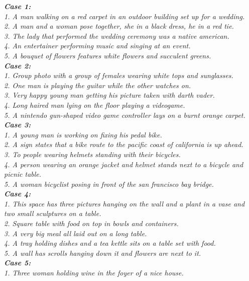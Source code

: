 \documentclass[10pt,twocolumn,letterpaper]{article}
\begin{document}
\textit{\footnotesize{\textbf{Case 1:}\\
1. A man walking on a red carpet in an outdoor building set up for a wedding.\\
2. A man and a woman pose together, she in a black dress, he in a red tie.\\
3. The lady that performed the wedding ceremony was a native american.\\
4. An entertainer performing music and singing at an event.\\
5. A bouquet of flowers features white flowers and succulent greens.\\
\textbf{Case 2:}\\
1. Group photo with a group of females wearing white tops and sunglasses.\\
2. One man is playing the guitar while the other watches on.\\
3. Very happy young man getting his picture taken with darth vader.\\
4. Long haired man lying on the floor playing a videogame.\\
5. A nintendo gun-shaped video game controller lays on a burnt orange carpet.\\
\textbf{Case 3:}\\
1. A young man is working on fixing his pedal bike.\\
2. A sign states that a bike route to the pacific coast of california is up ahead.\\
3. To people wearing helmets standing with their bicycles.\\
4. A person wearing an orange jacket and helmet stands next to a bicycle and picnic table.\\
5. A woman bicyclist posing in front of the san francisco bay bridge.\\
\textbf{Case 4:}\\
1. This space has three pictures hanging on the wall and a plant in a vase and two small sculptures on a table.\\
2. Square table with food on top in bowls and containers.\\
3. A very big meal all laid out on a long table.\\
4. A tray holding dishes and a tea kettle sits on a table set with food.\\
5. A wall has scrolls hanging down it and flowers are next to it.\\
\textbf{Case 5:}\\
1. Three woman holding wine in the foyer of a nice house.\\
}}
\end{document}
